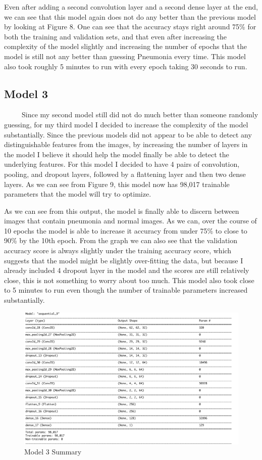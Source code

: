 \documentclass[12pt]{article}
\begin{document}
Even after adding a second convolution layer and a second dense layer at
the end, we can see that this model again does not do any better than
the previous model by looking at Figure 8. One can see that the accuracy
stays right around 75\% for both the training and validation sets, and
that even after increasing the complexity of the model slightly and
increasing the number of epochs that the model is still not any better
than guessing Pneumonia every time. This model also took roughly 5
minutes to run with every epoch taking 30 seconds to run.

\hypertarget{model-3}{%
\subsection{Model 3}\label{model-3}}

~~~~~Since my second model still did not do much better than someone
randomly guessing, for my third model I decided to increase the
complexity of the model substantially. Since the previous models did not
appear to be able to detect any distinguishable features from the
images, by increasing the number of layers in the model I believe it
should help the model finally be able to detect the underlying features.
For this model I decided to have 4 pairs of convolution, pooling, and
dropout layers, followed by a flattening layer and then two dense
layers. As we can see from Figure 9, this model now has 98,017 trainable
parameters that the model will try to optimize.

As we can see from this output, the model is finally able to discern
between images that contain pneumonia and normal images. As we can, over
the course of 10 epochs the model is able to increase it accuracy from
under 75\% to close to 90\% by the 10th epoch. From the graph we can
also see that the validation accuracy score is always slightly under the
training accuracy score, which suggests that the model might be slightly
over-fitting the data, but because I already included 4 dropout layer in
the model and the scores are still relatively close, this is not
something to worry about too much. This model also took close to 5
minutes to run even though the number of trainable parameters increased
substantially.\\

\begin{figure}

{\centering \includegraphics[width=0.75\linewidth,height=0.25\textheight]{images/model3} 

}

\caption{Model 3 Summary}\label{fig:sample-fig9}
\end{figure}
\end{document}
